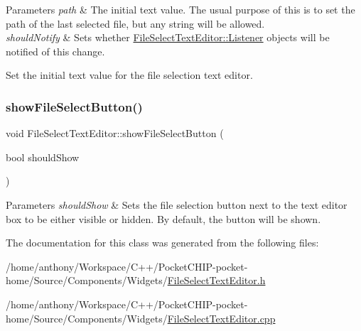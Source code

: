 \begin{DoxyParams}{Parameters}
{\em path} & The initial text value. The usual purpose of this is to set the path of the last selected file, but any string will be allowed.\\
\hline
{\em should\+Notify} & Sets whether \mbox{\hyperlink{classFileSelectTextEditor_1_1Listener}{File\+Select\+Text\+Editor\+::\+Listener}} objects will be notified of this change.\\
\hline
\end{DoxyParams}
Set the initial text value for the file selection text editor. \mbox{\label{classFileSelectTextEditor_a3a6690785fb56763277bd4fbfd4993d0}} 
\subsubsection{\texorpdfstring{show\+File\+Select\+Button()}{showFileSelectButton()}}
{\footnotesize\ttfamily void File\+Select\+Text\+Editor\+::show\+File\+Select\+Button (\begin{DoxyParamCaption}\item[{bool}]{should\+Show }\end{DoxyParamCaption})}


\begin{DoxyParams}{Parameters}
{\em should\+Show} & Sets the file selection button next to the text editor box to be either visible or hidden. By default, the button will be shown. \\
\hline
\end{DoxyParams}


The documentation for this class was generated from the following files\+:\begin{DoxyCompactItemize}
\item 
/home/anthony/\+Workspace/\+C++/\+Pocket\+C\+H\+I\+P-\/pocket-\/home/\+Source/\+Components/\+Widgets/\mbox{\hyperlink{FileSelectTextEditor_8h}{File\+Select\+Text\+Editor.\+h}}\item 
/home/anthony/\+Workspace/\+C++/\+Pocket\+C\+H\+I\+P-\/pocket-\/home/\+Source/\+Components/\+Widgets/\mbox{\hyperlink{FileSelectTextEditor_8cpp}{File\+Select\+Text\+Editor.\+cpp}}\end{DoxyCompactItemize}
